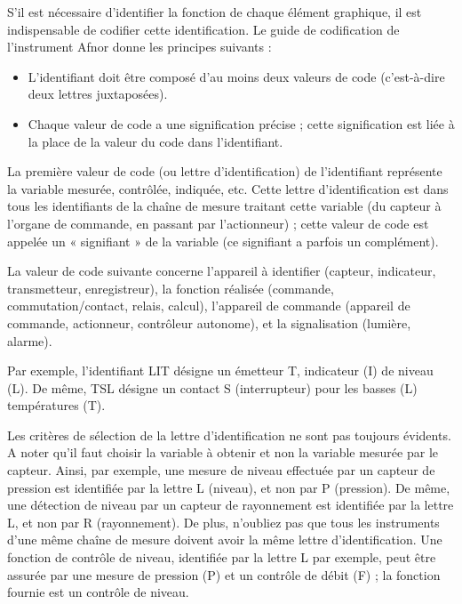 S'il est nécessaire d'identifier la fonction de chaque élément graphique, il est indispensable de codifier cette identification. Le guide de codification de l'instrument Afnor donne les principes suivants :

 \begin{itemize}
\item 	L'identifiant doit être composé d'au moins deux valeurs de code (c'est-à-dire deux lettres juxtaposées).
\item 	Chaque valeur de code a une signification précise ; cette signification est liée à la place de la valeur du code dans l'identifiant.
\end{itemize}

La première valeur de code (ou lettre d'identification) de l'identifiant représente la variable mesurée, contrôlée, indiquée, etc. Cette lettre d'identification est dans tous les identifiants de la chaîne de mesure traitant cette variable (du capteur à l'organe de commande, en passant par l'actionneur) ; cette valeur de code est appelée un « signifiant » de la variable (ce signifiant a parfois un complément).
\vspace{0.3cm}

La valeur de code suivante concerne l'appareil à identifier (capteur, indicateur, transmetteur, enregistreur), la fonction réalisée (commande, commutation/contact, relais, calcul), l'appareil de commande (appareil de commande, actionneur, contrôleur autonome), et la signalisation (lumière, alarme).
\vspace{0.3cm}

Par exemple, l'identifiant LIT désigne un émetteur T, indicateur (I) de niveau (L). De même, TSL désigne un contact S (interrupteur) pour les basses (L) températures (T).
\vspace{0.3cm}

Les critères de sélection de la lettre d'identification ne sont pas toujours évidents. A noter qu'il faut choisir la variable à obtenir et non la variable mesurée par le capteur. Ainsi, par exemple, une mesure de niveau effectuée par un capteur de pression est identifiée par la lettre L (niveau), et non par P (pression). De même, une détection de niveau par un capteur de rayonnement est identifiée par la lettre L, et non par R (rayonnement).
De plus, n'oubliez pas que tous les instruments d'une même chaîne de mesure doivent avoir la même lettre d'identification. Une fonction de contrôle de niveau, identifiée par la lettre L par exemple, peut être assurée par une mesure de pression (P) et un contrôle de débit (F) ; la fonction fournie est un contrôle de niveau.
\vspace{0.3cm}

